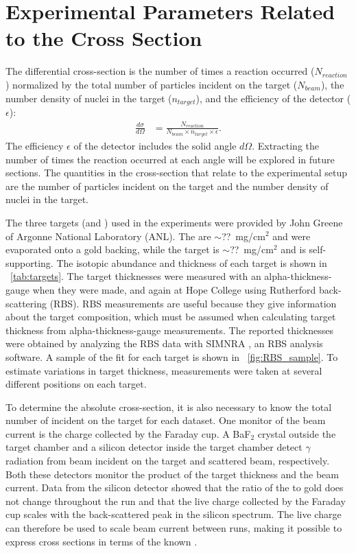 \section{Experimental Parameters Related to the Cross Section}

The differential cross-section is the number of times a reaction occurred ($N_{reaction}$) normalized by the total number of particles incident on the target ($N_{beam}$), the number density of nuclei in the target ($n_{target}$), and the efficiency of the detector ($\epsilon$):
\begin{align}
\frac{d\sigma}{d\Omega} &= \frac{N_{reaction}}{N_{beam} \times n_{target} \times \epsilon}.
\label{eq:cross_section}
\end{align}
The efficiency $\epsilon$ of the detector includes the solid angle $d\Omega$.  Extracting the number of times the reaction occurred at each angle will be explored in future sections.  The quantities in the cross-section that relate to the experimental setup are the number of particles incident on the target and the number density of nuclei in the target.

The three targets (\GeTargets and ) used in the experiments were provided by John Greene of Argonne National Laboratory (ANL).  The \GeTargets are $\sim$??~mg/cm$^2$ and were evaporated onto a gold backing, while the  target is $\sim$??~mg/cm$^2$ and is self-supporting.  The isotopic abundance and thickness of each target is shown in {\tab}~\ref{tab:targets}.  The target thicknesses were measured with an alpha-thickness-gauge when they were made, and again at Hope College using Rutherford back-scattering (RBS).  RBS measurements are useful because they give information about the target composition, which must be assumed when calculating target thickness from alpha-thickness-gauge measurements.  The reported thicknesses were obtained by analyzing the RBS data with SIMNRA \cite{SIMNRA}, an RBS analysis software.  A sample of the fit for each target is shown in {\fig}~\ref{fig:RBS_sample}.  To estimate variations in target thickness, measurements were taken at several different positions on each target.

To determine the absolute cross-section, it is also necessary to know the total number of  incident on the target for each dataset.  One monitor of the beam current is the charge collected by the Faraday cup.  A BaF$_2$ crystal outside the target chamber and a silicon detector inside the target chamber detect $\gamma$ radiation from beam incident on the target and scattered  beam, respectively.  Both these detectors monitor the product of the target thickness and the beam current.  Data from the silicon detector showed that the ratio of the \GeTargets to gold does not change throughout the run and that the live charge collected by the Faraday cup scales with the back-scattered peak in the silicon spectrum.  The live charge can therefore be used to scale beam current between runs, making it possible to express \reaction cross sections in terms of the known \MgReaction.

